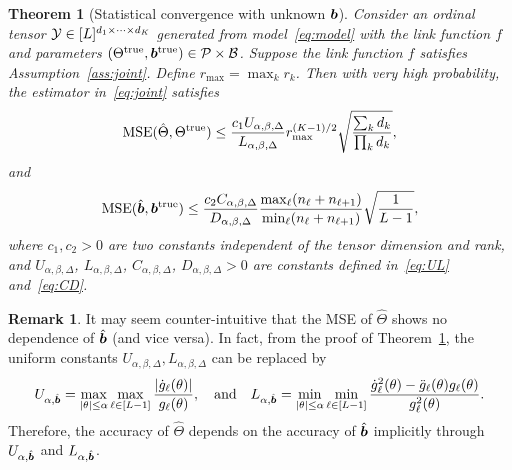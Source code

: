 \documentclass[11pt]{article}
\theoremstyle{plain}
\newtheorem{thm}{Theorem}[section]
\theoremstyle{definition}
\newtheorem{rmk}{Remark}
\begin{document}
\begin{thm}[Statistical convergence with unknown $\bm{b}$]\label{thm:ratejoint}
Consider an ordinal tensor $\mathcal{Y}\in[L]^{d_1\times \cdots \times d_K}$ generated from model~\eqref{eq:model} with the link function $f$ and parameters $(\Theta^{\mathrm{true}}, \bm{b}^{\mathrm{true}})\in\mathcal{P}\times \mathcal{B}$. Suppose the link function $f$ satisfies Assumption~\ref{ass:joint}. Define $r_{\max}=\max_k r_k$. Then with very high probability, the estimator in~\eqref{eq:joint} satisfies
\[
\text{MSE}(\hat \Theta, \Theta^{\mathrm{true}})\leq {c_1U_{\alpha,\beta,\Delta}\over L_{\alpha,\beta,\Delta}} r_{\max}^{(K-1)/2}  \sqrt{ \sum_k d_k \over \prod_k d_k},
\]
and
\[
\text{MSE}(\hat{\bm{b}}, \bm{b}^{\mathrm{true}}) \leq  {c_2 C_{\alpha,\beta,\Delta} \over D_{\alpha,\beta,\Delta}}{\max_{\ell}(n_\ell+n_{\ell+1})\over \min_{\ell}(n_{\ell}+n_{\ell+1})}  \sqrt{1\over L-1},
\]
where $c_1,c_2>0$ are two constants independent of the tensor dimension and rank, and $U_{\alpha,\beta,\Delta}$, $L_{\alpha,\beta,\Delta}$, $C_{\alpha,\beta,\Delta}$, $D_{\alpha,\beta,\Delta}>0$ are constants defined in~\eqref{eq:UL} and~\eqref{eq:CD}.
\end{thm}

\begin{rmk} It may seem counter-intuitive that the MSE of $\hat \Theta$ shows no dependence of $\hat {\bm{b}}$ (and vice versa). In fact, from the proof of Theorem~\ref{thm:ratejoint}, the uniform constants $U_{\alpha,\beta,\Delta}, L_{\alpha,\beta,\Delta}$ can be replaced by
\[
U_{\alpha,\hat {\bm{b}}}=\max_{|\theta|\leq \alpha}\max_{\ell\in[L-1]}{|\dot{g}_\ell(\theta)|\over g_\ell(\theta)},\quad \text{and}\quad L_{\alpha,\hat {\bm{b}}}=\min_{|\theta|\leq \alpha}\min_{\ell\in[L-1]} {\dot{g}^2_\ell(\theta)-\ddot{g}_\ell(\theta)g_\ell(\theta)\over g^2_\ell(\theta)}.
\]
Therefore, the accuracy of $\hat \Theta$ depends on the accuracy of $\hat {\bm{b}}$ implicitly through $U_{\alpha, \hat {\bm{b}}}$ and $ L_{\alpha,\hat {\bm{b}}}$.

\end{rmk}
\end{document}
